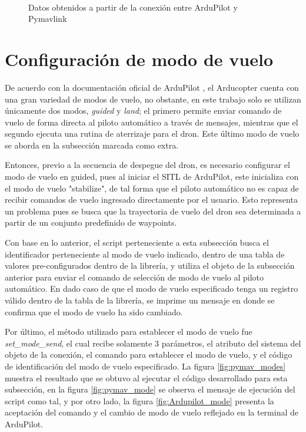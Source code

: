 \begin{figure}[ht]
    \centering
    \\
    \caption{Datos obtenidos a partir de la conexión entre ArduPilot y Pymavlink} 
    \label{fig:pymav_listen}
\end{figure}


\section{Configuración de modo de vuelo}

De acuerdo con la documentación oficial de ArduPilot \cite{Ardu_modes}, el Arducopter cuenta con una gran variedad de modos de vuelo, no obstante, en este trabajo solo se utilizan únicamente dos modos, \textit{guided} y \textit{land}; el primero permite enviar comando de vuelo de forma directa al piloto automático a través de mensajes, mientras que el segundo ejecuta una rutina de aterrizaje para el dron. Este último modo de vuelo se aborda en la subsección marcada como extra.

Entonces, previo a la secuencia de despegue del dron, es necesario configurar el modo de vuelo en guided, pues al iniciar el SITL de ArduPilot, este inicializa con el modo de vuelo "stabilize", de tal forma que el piloto automático no es capaz de recibir comandos de vuelo ingresado directamente por el usuario. Esto representa un problema pues se busca que la trayectoria de vuelo del dron sea determinada a partir de un conjunto predefinido de waypoints.

Con base en lo anterior, el script perteneciente a esta subsección busca el identificador perteneciente al modo de vuelo indicado, dentro de una tabla de valores pre-configurados dentro de la librería, y utiliza el objeto de la subsección anterior para enviar el comando de selección de modo de vuelo al piloto automático. En dado caso de que el modo de vuelo especificado tenga un registro válido dentro de la tabla de la librería, se imprime un mensaje en donde se confirma que el modo de vuelo ha sido cambiado.

Por último, el método utilizado para establecer el modo de vuelo fue \textit{set\_mode\_send}, el cual recibe solamente 3 parámetros, el atributo del sistema del objeto de la conexión, el comando para establecer el modo de vuelo, y el código de identificación del modo de vuelo especificado. La figura \ref{fig:pymav_modes} muestra el resultado que se obtuvo al ejecutar el código desarrollado para esta subsección, en la figura \ref{fig:pymav_mode} se observa el mensaje de ejecución del script como tal, y por otro lado, la figura \ref{fig:Ardupilot_mode} presenta la aceptación del comando y el cambio de modo de vuelo reflejado en la terminal de ArduPilot.


